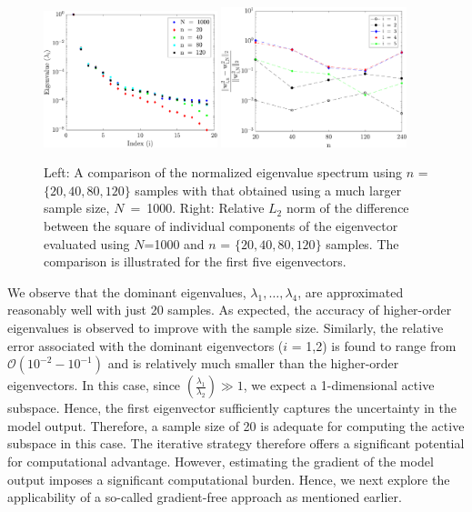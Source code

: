 %
\begin{figure}[htbp]
 \begin{center}
  \includegraphics[width=0.45\textwidth]{./Figures/eig_comp}
   \includegraphics[width=0.48\textwidth]{./Figures/err_eigv_1_5}
\caption{Left: A comparison of the normalized eigenvalue spectrum using $n$ = $\{20,40,80,120\}$ samples with that
obtained using a much larger sample size, $N$~=~1000. Right: Relative $L_2$ 
norm of the difference between
the square of individual components of the eigenvector evaluated using $N$=1000 and $n$ = $\{20,40,80,120\}$ samples.
The comparison is illustrated for the first five eigenvectors.} 
\label{fig:eig_comp}
\end{center}
\end{figure}
%
We observe that the dominant eigenvalues, $\lambda_1, \ldots, \lambda_4$, 
are approximated 
reasonably well with just 20 samples. As expected, the accuracy of higher-order eigenvalues is observed
to improve with the sample size. Similarly, the relative error associated with the dominant eigenvectors
($i$ = 1,2) is found to range from $\mathcal{O}(10^{-2} - 10^{-1})$ and is relatively much smaller than 
the higher-order eigenvectors. In this case, since 
$\left(\frac{\lambda_1}{\lambda_2}\right)\gg 1$, we expect 
a 1-dimensional active subspace. Hence, the first eigenvector 
sufficiently captures the uncertainty in
the  model output. Therefore, a sample size of 20 is adequate for computing the active subspace in this
case. The iterative strategy therefore offers a significant potential for computational advantage. 
However, estimating the gradient of the model output imposes a significant computational burden.
Hence, we next explore the applicability of a so-called gradient-free approach
as mentioned earlier.


